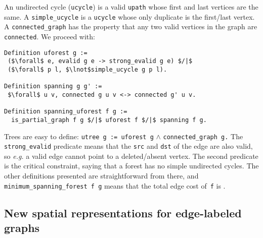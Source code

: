 An undirected cycle (\texttt{ucycle}) is a valid \texttt{upath} whose first 
and last vertices are the same.  A \texttt{simple\_ucycle} is a \texttt{ucycle} whose
only duplicate is the first/last vertex. A \texttt{connected\_graph}
has the property that any two valid vertices in the graph are \texttt{connected}.
We proceed with:
\lstset{style=CoqStyle}
\begin{lstlisting}
Definition uforest g := 
 ($\forall$ e, evalid g e -> strong_evalid g e) $/|$
 ($\forall$ p l, $\lnot$simple_ucycle g p l).

Definition spanning g g' := 
 $\forall$ u v, connected g u v <-> connected g' u v.

Definition spanning_uforest f g :=
  is_partial_graph f g $/|$ uforest f $/|$ spanning f g. 
\end{lstlisting}
Trees are easy to define:
\texttt{utree~g~:= uforest~g} $\wedge$ \texttt{connected\_graph~g.}
The \texttt{strong\_evalid} predicate means that the 
\texttt{src} and \texttt{dst} of the edge are also valid, so
\emph{e.g.} a valid edge cannot point to a deleted/absent vertex.
The second predicate is the critical constraint, saying that a
forest has no simple undirected cycles. The other definitions presented
are straightforward from there, and 
\texttt{minimum\_spanning\_forest f g} means that the total edge cost 
of~\texttt{f} is .



\subsection{New spatial representations for edge-labeled graphs}

